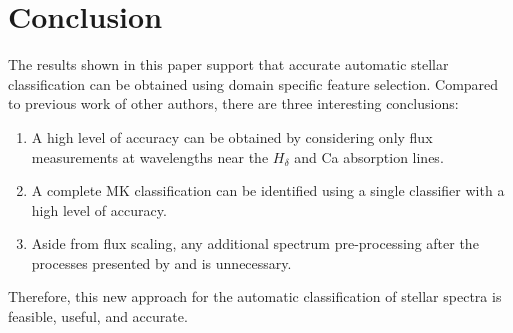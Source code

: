 \documentclass[./AutomatedMK.tex]{subfiles}
\begin{document}
\section{Conclusion}\label{sec:conc}

The results shown in this paper support that accurate automatic stellar classification can be obtained using domain specific feature selection. Compared to previous work of other authors, there are three interesting conclusions:

\begin{enumerate}
	\item A high level of accuracy can be obtained by considering only flux measurements at wavelengths near the $H_\delta$ and Ca  absorption lines.
	\item A complete MK classification can be identified using a single classifier with a high level of accuracy.
	\item Aside from flux scaling, any additional spectrum pre-processing after the processes presented by \citeauthor{Dawson} and \citeauthor{Stoughton} is unnecessary. 
\end{enumerate}

Therefore, this new approach for the automatic classification of stellar spectra is feasible, useful, and accurate. 
\end{document}
